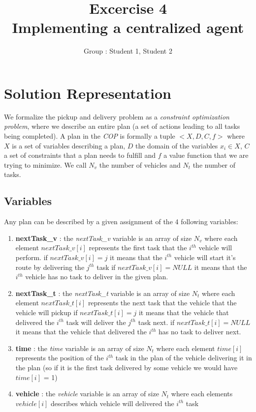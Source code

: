 \documentclass[11pt]{article}
\title{\bf Excercise 4\\ Implementing a centralized agent}
\author{Group \textnumero : Student 1, Student 2}
\begin{document}
\maketitle

\section{Solution Representation}

We formalize the pickup and delivery problem as a \textit{constraint optimization problem}, where we describe an entire plan (a set of actions leading to all tasks being completed). A plan in the \textit{COP} is formally a tuple $< X, D, C, f >$ where $X$ is a set of variables describing a plan, $D$ the domain of the variables $x_i \in X$, $C$ a set of constraints that a plan needs to fulfill and $f$ a value function that we are trying to minimize. We call $N_v$ the number of vehicles and $N_t$ the number of tasks.


\subsection{Variables}
Any plan can be described by a given assignment of the 4 following variables:
\begin{enumerate}
    \item \textbf{nextTask\_v} : the \textit{nextTask\_v} variable is an array of size $N_v$ where each element $nextTask\_v[i]$ represents the first task that the $i^{th}$ vehicle will perform.
    \subitem if $nextTask\_v[i] = j$ it means that the $i^{th}$ vehicle will start it's route by delivering the $j^{th}$ task
    \subitem if $nextTask\_v[i] = NULL$  it means that the $i^{th}$ vehicle has no task to deliver in the given plan.
    \item \textbf{nextTask\_t} : the \textit{nextTask\_t} variable is an array of size $N_t$ where each element $nextTask\_t[i]$ represents the next task that the vehicle that the vehicle will pickup
    \subitem if $nextTask\_t[i] = j$ it means that the vehicle that delivered the $i^{th}$ task will deliver the $j^{th}$ task next.
    \subitem if $nextTask\_t[i] = NULL$  it means that the vehicle that delivered the $i^{th}$ has no task to deliver next.
    \item \textbf{time} : the \textit{time} variable is an array of size $N_t$ where each element $time[i]$ represents the position of the $i^{th}$ task in the plan of the vehicle delivering it in the plan (so if it is the first task delivered by some vehicle we would have $time[i]$ = 1)
    \item \textbf{vehicle} : the \textit{vehicle} variable is an array of size $N_t$ where each elements $vehicle[i]$ describes which vehicle will delivered the $i^{th}$ task
\end{enumerate}
\end{document}
